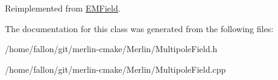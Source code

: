 Reimplemented from \hyperlink{classEMField_aa00f4f213a55c9223f6ca08463a57691}{E\+M\+Field}.



The documentation for this class was generated from the following files\+:\begin{DoxyCompactItemize}
\item 
/home/fallon/git/merlin-\/cmake/\+Merlin/Multipole\+Field.\+h\item 
/home/fallon/git/merlin-\/cmake/\+Merlin/Multipole\+Field.\+cpp\end{DoxyCompactItemize}
